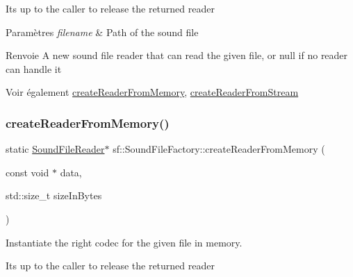 It\textquotesingle{}s up to the caller to release the returned reader


\begin{DoxyParams}{Paramètres}
{\em filename} & Path of the sound file\\
\hline
\end{DoxyParams}
\begin{DoxyReturn}{Renvoie}
A new sound file reader that can read the given file, or null if no reader can handle it
\end{DoxyReturn}
\begin{DoxySeeAlso}{Voir également}
\hyperlink{classsf_1_1SoundFileFactory_aee7a0ff1eace98d5325eaadc7d26d50c}{create\+Reader\+From\+Memory}, \hyperlink{classsf_1_1SoundFileFactory_a8d4b1f225b72a128ddba3be22f7ba5a2}{create\+Reader\+From\+Stream} 
\end{DoxySeeAlso}
\mbox{\label{classsf_1_1SoundFileFactory_aee7a0ff1eace98d5325eaadc7d26d50c}} 
\subsubsection{\texorpdfstring{create\+Reader\+From\+Memory()}{createReaderFromMemory()}}
{\footnotesize\ttfamily static \hyperlink{classsf_1_1SoundFileReader}{Sound\+File\+Reader}$\ast$ sf\+::\+Sound\+File\+Factory\+::create\+Reader\+From\+Memory (\begin{DoxyParamCaption}\item[{const void $\ast$}]{data,  }\item[{std\+::size\+\_\+t}]{size\+In\+Bytes }\end{DoxyParamCaption})\hspace{0.3cm}{\ttfamily [static]}}



Instantiate the right codec for the given file in memory. 

It\textquotesingle{}s up to the caller to release the returned reader


